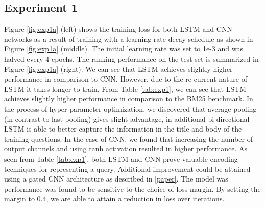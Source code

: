 \documentclass{sigkddExp}
\begin{document}
\subsection{Experiment 1}
{\color{red} Figure \ref{fig:exp1a} (left) shows the training loss for both LSTM and CNN networks as a result of training with a learning rate decay schedule as shown in Figure \ref{fig:exp1a} (middle). The initial learning rate was set to 1e-3 and was halved every $4$ epochs. The ranking performance on the test set is summarized in Figure \ref{fig:exp1a} (right). We can see that LSTM achieves slightly higher performance in comparison to CNN. However, due to the re-current nature of LSTM it takes longer to train. From Table \ref{tab:exp1}, we can see that LSTM achieves slightly higher performance in comparison to the BM25 benchmark. In the process of hyper-parameter optimization, we discovered that average pooling (in contrast to last pooling) gives slight advantage, in additional bi-directional LSTM is able to better capture the information in the title and body of the training questions. In the case of CNN, we found that increasing the number of output channels and using tanh activation resulted in higher performance. As seen from Table \ref{tab:exp1}, both LSTM and CNN prove valuable encoding techniques for representing a query. Additional improvement could be attained using a gated CNN architecture as described in \ref{paper}. The model was performance was found to be sensitive to the choice of loss margin. By setting the margin to 0.4, we are able to attain a reduction in loss over iterations.}
\end{document}
